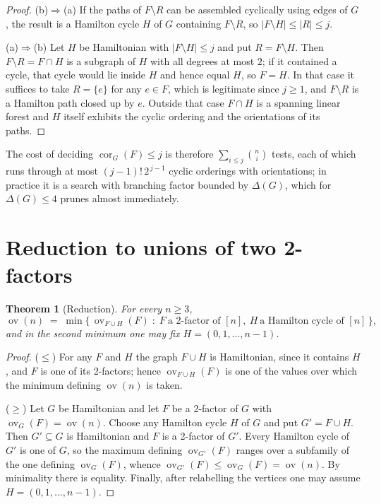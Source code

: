 \documentclass[11pt,a4paper]{article}
\newtheorem{theorem}{Theorem}[section]
\theoremstyle{definition}
\theoremstyle{remark}
\newcommand{\ov}{\operatorname{ov}}
\newcommand{\cor}{\operatorname{cor}}
\begin{document}
\begin{proof}
(b)$\Rightarrow$(a) If the paths of $F\setminus R$ can be assembled cyclically using edges of $G$, the result is a Hamilton cycle $H$ of $G$ containing $F\setminus R$, so $|F\setminus H|\le|R|\le j$.

(a)$\Rightarrow$(b) Let $H$ be Hamiltonian with $|F\setminus H|\le j$ and put $R=F\setminus H$. Then $F\setminus R=F\cap H$ is a subgraph of $H$ with all degrees at most $2$; if it contained a cycle, that cycle would lie inside $H$ and hence equal $H$, so $F=H$. In that case it suffices to take $R=\{e\}$ for any $e\in F$, which is legitimate since $j\ge1$, and $F\setminus R$ is a Hamilton path closed up by $e$. Outside that case $F\cap H$ is a spanning linear forest and $H$ itself exhibits the cyclic ordering and the orientations of its paths.
\end{proof}

The cost of deciding $\cor_G(F)\le j$ is therefore $\sum_{i\le j}\binom{n}{i}$ tests, each of which runs through at most $(j-1)!\,2^{\,j-1}$ cyclic orderings with orientations; in practice it is a search with branching factor bounded by $\Delta(G)$, which for $\Delta(G)\le4$ prunes almost immediately.

\section{Reduction to unions of two 2-factors}\label{sec:reduction}

\begin{theorem}[Reduction]\label{thm:reduction}
For every $n\ge3$,
\[
\ov(n)\;=\;\min\bigl\{\,\ov_{F\cup H}(F)\;:\;F\ \text{a 2-factor of }[n],\
H\ \text{a Hamilton cycle of }[n]\,\bigr\},
\]
and in the second minimum one may fix $H=(0,1,\dots,n-1)$.
\end{theorem}

\begin{proof}
($\le$) For any $F$ and $H$ the graph $F\cup H$ is Hamiltonian, since it contains $H$, and $F$ is one of its 2-factors; hence $\ov_{F\cup H}(F)$ is one of the values over which the minimum defining $\ov(n)$ is taken.

($\ge$) Let $G$ be Hamiltonian and let $F$ be a 2-factor of $G$ with $\ov_G(F)=\ov(n)$. Choose any Hamilton cycle $H$ of $G$ and put $G'=F\cup H$. Then $G'\subseteq G$ is Hamiltonian and $F$ is a 2-factor of $G'$. Every Hamilton cycle of $G'$ is one of $G$, so the maximum defining $\ov_{G'}(F)$ ranges over a subfamily of the one defining $\ov_G(F)$, whence $\ov_{G'}(F)\le\ov_G(F)=\ov(n)$. By minimality there is equality. Finally, after relabelling the vertices one may assume $H=(0,1,\dots,n-1)$.
\end{proof}
\end{document}
